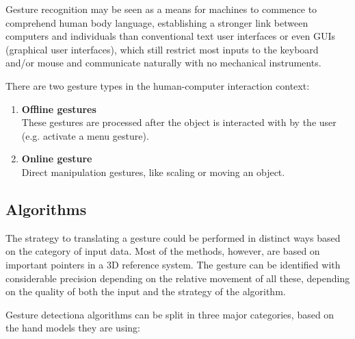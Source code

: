 \documentclass[12pt,a4paper,twoside]{report}
\begin{document}
Gesture recognition may be seen as a means for machines to commence to comprehend human body language, establishing a stronger link between computers and individuals than conventional text user interfaces or even GUIs (graphical user interfaces), which still restrict  most inputs to the keyboard and/or mouse and communicate naturally with no mechanical instruments.

There are two gesture types in the human-computer interaction context:

\begin{enumerate}
  \item \textbf{Offline gestures} \\
    These gestures are processed after the object is interacted with by the user (e.g. activate a menu gesture).

  \item \textbf{Online gesture} \\
    Direct manipulation gestures, like scaling or moving an object.
\end{enumerate}

\subsection{Algorithms}
The strategy to translating a gesture could be performed in distinct ways based on the category of input data. Most of the methods, however, are based on important pointers in a 3D reference system. The gesture can be identified with considerable precision depending on the relative movement of all these, depending on the quality of both the input and the strategy of the algorithm.

Gesture detectiona algorithms can be split in three major categories, based on the hand models they are using:
\end{document}
